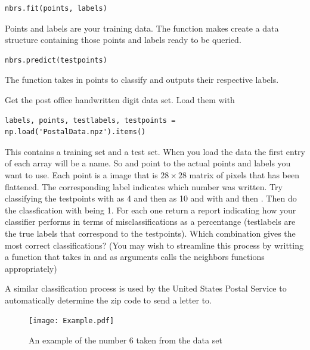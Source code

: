 \begin{lstlisting}
nbrs.fit(points, labels)
\end{lstlisting}
Points and labels are your training data. 
The  function makes  create a data structure containing those points and labels ready to be queried. 

\begin{lstlisting}
nbrs.predict(testpoints)
\end{lstlisting}

The function  takes in points to classify and outputs their respective labels.  
\begin{problem}
Get the post office handwritten digit data set. Load them with
\begin{lstlisting}
labels, points, testlabels, testpoints = np.load('PostalData.npz').items()
\end{lstlisting}
This contains a training set and a test set. 
When you load the data the first entry of each array will be a name. 
So  and  point to the actual points and labels you want to use. 
Each point is a  image that is $28 \times 28$ matrix of pixels that has been flattened. 
The corresponding label indicates which number was written.  
Try classifying the testpoints with  as 4 and then as 10 and with   and then . Then do the classfication with  being 1. 
For each one return a report indicating how your classifier performs in terms of misclassifications as a percentange (testlabels are the true labels that correspond to the testpoints). 
Which combination gives the most correct classifications?
(You may wish to streamline this process by writting a function that takes in  and  as arguments calls the neighbors functions appropriately)


A similar classification process is used by the United States Postal Service to automatically determine the zip code to send a letter to.

\begin{figure}[H]
\texttt{[image: Example.pdf]}
\caption{An example of the number 6 taken from the data set}
\end{figure}
\end{problem}


